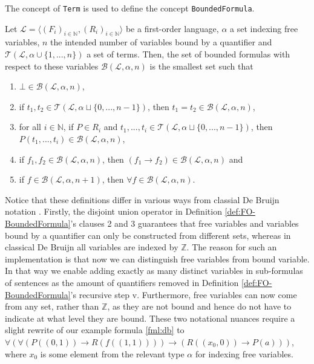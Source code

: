 The concept of \texttt{Term} is used to define the concept \texttt{BoundedFormula}.

\begin{definition}\label{def:FO-BoundedFormula}
  \leanok
    Let $\mathcal{L} = \langle (F_i)_{i \in \mathbb{N}}, (R_i)_{i \in \mathbb{N}} \rangle$ be a first-order language, $\alpha$ a set indexing free variables, $n$ the intended number of variables bound by a quantifier and $\mathcal{T}(\mathcal{L}, \alpha \cup \{1,...,n\})$ a set of terms. Then, the set of bounded formulas with respect to these variables $\mathcal{B}(\mathcal{L},\alpha,n)$ is the smallest set such that
    \begin{enumerate}
        \item $\bot \in \mathcal{B}(\mathcal{L},\alpha,n)$,
        \item if $t_1,t_2 \in \mathcal{T}(\mathcal{L}, \alpha \sqcup \{0,...,n-1\})$, then $t_1 = t_2 \in \mathcal{B}(\mathcal{L},\alpha,n)$,
        \item for all $i \in \mathbb{N}$, if $P \in R_i$ and $t_1,...,t_i \in \mathcal{T}(\mathcal{L}, \alpha \sqcup \{0,...,n-1\})$, then $P(t_1,...,t_i) \in \mathcal{B}(\mathcal{L},\alpha,n)$,
        \item if $f_1,f_2 \in \mathcal{B}(\mathcal{L},\alpha,n)$, then $(f_1 \rightarrow f_2) \in \mathcal{B}(\mathcal{L},\alpha,n)$ and
        \item if $f \in \mathcal{B}(\mathcal{L},\alpha,n+1)$, then $\forall f \in \mathcal{B}(\mathcal{L},\alpha,n)$.
    \end{enumerate}
\end{definition}

Notice that these definitions differ in various ways from classial De Bruijn notation \cite{bruijn:1972}. Firstly, the disjoint union operator in Definition \ref{def:FO-BoundedFormula}'s clauses 2 and 3 guarantees that free variables and variables bound by a quantifier can only be constructed from different sets, whereas in classical De Bruijn all variables are indexed by $\mathbb{Z}$. The reason for such an implementation is that now we can distinguish free variables from bound variable. In that way we enable adding exactly as many distinct variables in sub-formulas of sentences as the amount of quantifiers removed in Definition \ref{def:FO-BoundedFormula}'s recursive step v. Furthermore, free variables can now come from any set, rather than $\mathbb{Z}$, as they are not bound and hence do not have to indicate at what level they are bound. These two notational nuances require a slight rewrite of our example formula \ref{fml:db} to $\forall (\forall(P((0,1)) \rightarrow R(f((1,1)))) \to (R((x_0,0)) \to P(a)))$, where $x_0$ is some element from the relevant type $\alpha$ for indexing free variables.

